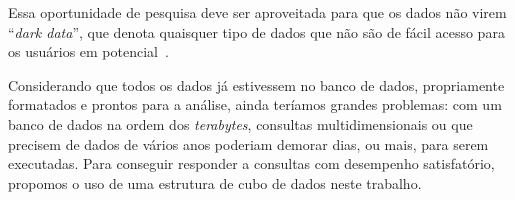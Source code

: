 Essa oportunidade de pesquisa deve ser aproveitada para que os dados não virem ``\textit{dark data}'', que denota quaisquer tipo de dados que não são de fácil acesso para os usuários em potencial~\cite{heidornSheddingLightDark2008}.

Considerando que todos os dados já estivessem no banco de dados, propriamente formatados e prontos para a análise, ainda teríamos grandes problemas: com um banco de dados na ordem dos \textit{terabytes}, consultas multidimensionais ou que precisem de dados de vários anos poderiam demorar dias, ou mais, para serem executadas.
Para conseguir responder a consultas com desempenho satisfatório, propomos o uso de uma estrutura de cubo de dados neste trabalho.

%
%
%
%
%
%
